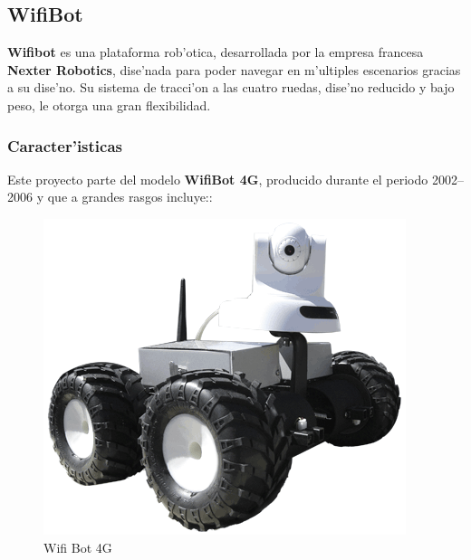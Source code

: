 \documentclass[twoside,12pt]{article}
\begin{document}
\subsection{WifiBot}
\textbf{Wifibot} es una plataforma rob'otica, desarrollada por la empresa francesa \textbf{Nexter Robotics}, dise'nada para poder navegar en m'ultiples escenarios gracias a su dise'no. Su sistema de tracci'on a las cuatro ruedas, dise'no reducido y bajo peso, le otorga una gran flexibilidad.

\subsubsection{Caracter'isticas}
Este proyecto parte del modelo \textbf{WifiBot 4G}, producido durante el periodo 2002--2006 y que a grandes rasgos incluye::

\begin{figure}[ht]
\centering
\includegraphics[scale=0.5]{images/Visuel_Wifibot_2.png} 
\caption{Wifi Bot 4G}
\label{fig:Wifi Bot 4G}
\end{figure}

\paragraph*{}
\end{document}

